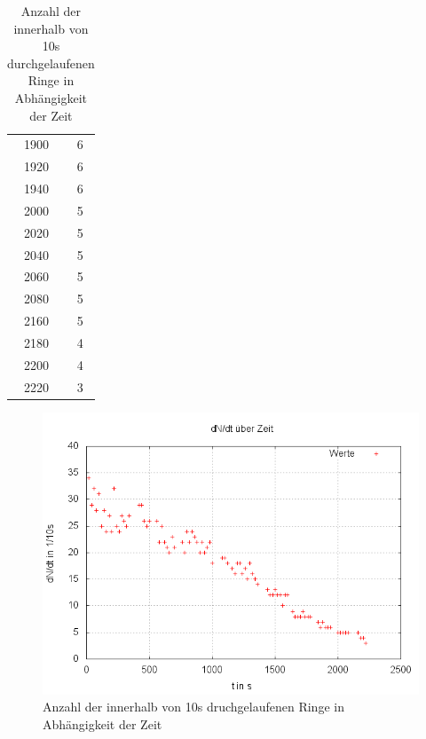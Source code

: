 \begin{table}
\begin{tabular}{c|c}
1900&	6\\ 

1920&	6\\ 

1940&	6\\ 

2000&	5\\ 

2020&	5\\ 

2040&	5\\ 

2060&	5\\ 

2080&	5\\ 

2160&	5\\ 

2180&	4\\ 

2200&	4\\ 

2220&	3\\ 

\end{tabular} 

\label{tbl_1}
\caption{Anzahl der innerhalb von 10s durchgelaufenen Ringe in Abhängigkeit der Zeit}
\end{table}

\begin{figure}
\centering
        \includegraphics[width=.8\textwidth]{images/dNdt(t).png}
\caption{Anzahl der innerhalb von 10s druchgelaufenen Ringe in Abhängigkeit der Zeit}
\label{dNdt(t)}
\end{figure}


